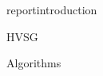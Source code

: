 \documentclass[a4paper,10pt]{report}
\title{}
\author{}
\begin{document}
\maketitle
\tableofcontents

{reportintroduction}

{HVSG}

{Algorithms}


\begin{thebibliography}{99.}
\end{thebibliography}
\end{document}
